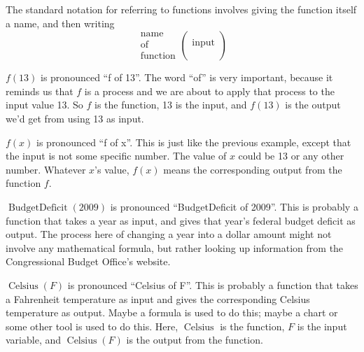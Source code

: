 \begin{specialnote}
The standard notation for referring to functions involves giving the function itself a name, and then writing
			\begin{displaymath}\begin{array}{cc}
                                \text{name}\\
                                \text{of}\\
                                \text{function}
                        \end{array}
                        \left(
                        \begin{array}{cc}
                                \\
                                \text{input}\\
                                \\
                        \end{array}\right)\end{displaymath}\end{specialnote}
%
\begin{example}\label{}
$f(\num{13})$ is pronounced ``f of 13''. The word ``of'' is very important,
        		because it reminds us that $f$ is a process and we are about to apply that
        		process to the input value \num{13}. So $f$ is the function, \num{13} is the
        		input, and $f(\num{13})$ is the output we'd get from using \num{13} as input.
%
\par $f(x)$ is pronounced ``f of x''. This is just like the previous example,
        		except that the input is not some specific number. The value of $x$ could be
        		\num{13} or any other number. Whatever $x$'s value, $f(x)$ means the corresponding
        		output from the function $f$.
%
\par $\operatorname{BudgetDeficit}(2009)$ is pronounced ``BudgetDeficit of 2009''.
        		This is probably a function that takes a year as input, and gives that
        		year's federal budget deficit as output. The process here of changing a year
        		into a dollar amount might not involve any mathematical formula, but rather
        		looking up information from the Congressional Budget Office's website.
%
\par $\operatorname{Celsius}(F)$ is pronounced ``Celsius of F''. This is probably
        		a function that takes a Fahrenheit temperature as input and gives the
        		corresponding Celsius temperature as output. Maybe a formula is used to do this;
        		maybe a chart or some other tool is used to do this. Here, $\operatorname{Celsius}$
        		is the function, $F$ is the input variable, and $\operatorname{Celsius}(F)$ is the output from the function.
%
\end{example}
